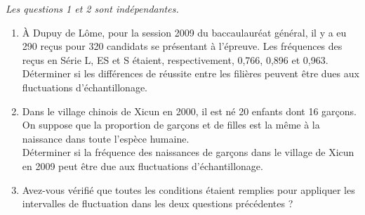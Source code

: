 \begin{exo}
\emph{Les questions 1 et 2 sont ind\'ependantes.}
\begin{enumerate}
 \item \`A Dupuy de L\^ome, pour la session 2009 du baccaulaur\'eat g\'en\'eral, il y a eu 290 re\c cus pour 320 candidats se pr\'esentant \`a l'\'epreuve.
Les fr\'equences des re\c cus en S\'erie L, ES et S \'etaient, respectivement, 0,766, 0,896 et 0,963.\\
 D\'eterminer si les diff\'erences de r\'eussite entre les fili\`eres peuvent \^etre dues aux fluctuations d'\'echantillonage.
 \item Dans le village chinois de Xicun en 2000, il est n\'e 20 enfants dont 16 gar\c cons. On suppose que la proportion de gar\c cons et de filles est la m\^eme \`a la naissance dans toute l'esp\`ece humaine.\\
D\'eterminer si la fr\'equence des naissances de gar\c cons dans le village de Xicun en 2009 peut \^etre due aux fluctuations d'\'echantillonage.
 \item Avez-vous v\'erifi\'e que toutes les conditions \'etaient remplies pour appliquer les intervalles de fluctuation dans les deux questions pr\'ec\'edentes ?
\end{enumerate}


\end{exo}



